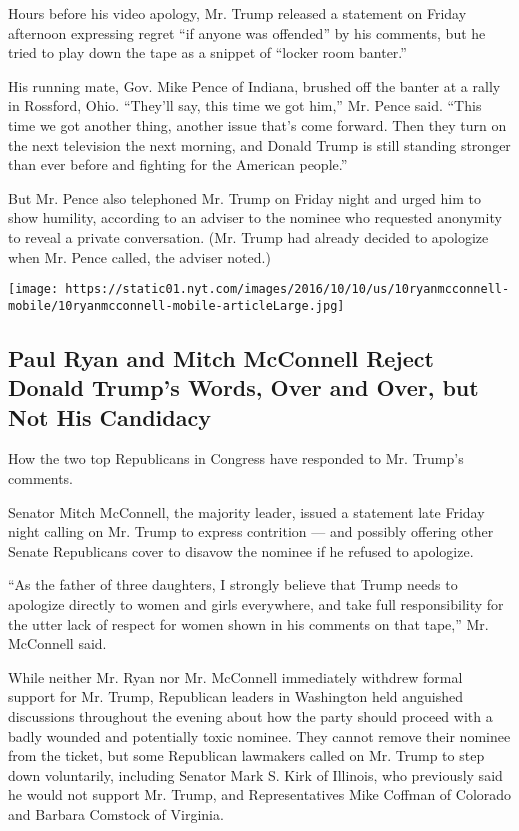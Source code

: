 Hours before his video apology, Mr. Trump released a statement on Friday
afternoon expressing regret ``if anyone was offended'' by his comments,
but he tried to play down the tape as a snippet of ``locker room
banter.''

His running mate, Gov. Mike Pence of Indiana, brushed off the banter at
a rally in Rossford, Ohio. ``They'll say, this time we got him,'' Mr.
Pence said. ``This time we got another thing, another issue that's come
forward. Then they turn on the next television the next morning, and
Donald Trump is still standing stronger than ever before and fighting
for the American people.''

But Mr. Pence also telephoned Mr. Trump on Friday night and urged him to
show humility, according to an adviser to the nominee who requested
anonymity to reveal a private conversation. (Mr. Trump had already
decided to apologize when Mr. Pence called, the adviser noted.)

\href{https://www.nytimes.com/interactive/2016/10/08/us/politics/how-paul-ryan-and-mitch-mcconnell-have-disavowed-trumps-words-but-not-their-support.html}{}

\texttt{[image: https://static01.nyt.com/images/2016/10/10/us/10ryanmcconnell-mobile/10ryanmcconnell-mobile-articleLarge.jpg]}

\hypertarget{paul-ryan-and-mitch-mcconnell-reject-donald-trumps-words-over-and-over-but-not-his-candidacy}{%
\subsection{Paul Ryan and Mitch McConnell Reject Donald Trump's Words,
Over and Over, but Not His
Candidacy}\label{paul-ryan-and-mitch-mcconnell-reject-donald-trumps-words-over-and-over-but-not-his-candidacy}}

How the two top Republicans in Congress have responded to Mr. Trump's
comments.

Senator Mitch McConnell, the majority leader, issued a statement late
Friday night calling on Mr. Trump to express contrition --- and possibly
offering other Senate Republicans cover to disavow the nominee if he
refused to apologize.

``As the father of three daughters, I strongly believe that Trump needs
to apologize directly to women and girls everywhere, and take full
responsibility for the utter lack of respect for women shown in his
comments on that tape,'' Mr. McConnell said.

While neither Mr. Ryan nor Mr. McConnell immediately withdrew formal
support for Mr. Trump, Republican leaders in Washington held anguished
discussions throughout the evening about how the party should proceed
with a badly wounded and potentially toxic nominee. They cannot remove
their nominee from the ticket, but some Republican lawmakers called on
Mr. Trump to step down voluntarily, including Senator Mark S. Kirk of
Illinois, who previously said he would not support Mr. Trump, and
Representatives Mike Coffman of Colorado and Barbara Comstock of
Virginia.

